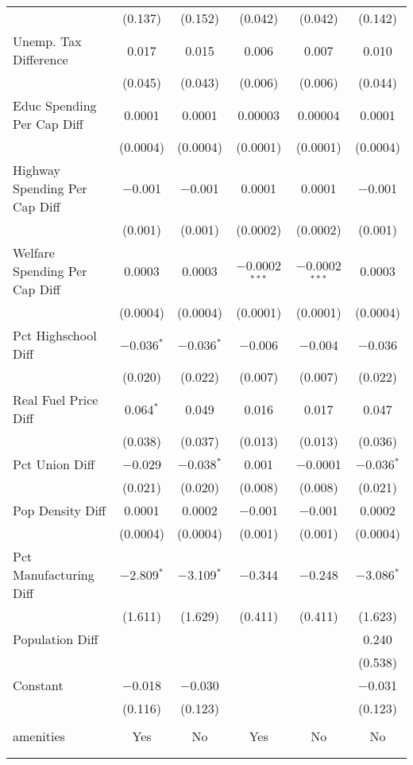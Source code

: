 \begin{table}[!htbp]
\begin{tabular}{@{\extracolsep{5pt}}lccccc}
  & (0.137) & (0.152) & (0.042) & (0.042) & (0.142) \\ 
  Unemp. Tax Difference & 0.017 & 0.015 & 0.006 & 0.007 & 0.010 \\ 
  & (0.045) & (0.043) & (0.006) & (0.006) & (0.044) \\ 
  Educ Spending Per Cap Diff & 0.0001 & 0.0001 & 0.00003 & 0.00004 & 0.0001 \\ 
  & (0.0004) & (0.0004) & (0.0001) & (0.0001) & (0.0004) \\ 
  Highway Spending Per Cap Diff & $-$0.001 & $-$0.001 & 0.0001 & 0.0001 & $-$0.001 \\ 
  & (0.001) & (0.001) & (0.0002) & (0.0002) & (0.001) \\ 
  Welfare Spending Per Cap Diff & 0.0003 & 0.0003 & $-$0.0002$^{***}$ & $-$0.0002$^{***}$ & 0.0003 \\ 
  & (0.0004) & (0.0004) & (0.0001) & (0.0001) & (0.0004) \\ 
  Pct Highschool Diff & $-$0.036$^{*}$ & $-$0.036$^{*}$ & $-$0.006 & $-$0.004 & $-$0.036 \\ 
  & (0.020) & (0.022) & (0.007) & (0.007) & (0.022) \\ 
  Real Fuel Price Diff & 0.064$^{*}$ & 0.049 & 0.016 & 0.017 & 0.047 \\ 
  & (0.038) & (0.037) & (0.013) & (0.013) & (0.036) \\ 
  Pct Union Diff & $-$0.029 & $-$0.038$^{*}$ & 0.001 & $-$0.0001 & $-$0.036$^{*}$ \\ 
  & (0.021) & (0.020) & (0.008) & (0.008) & (0.021) \\ 
  Pop Density Diff & 0.0001 & 0.0002 & $-$0.001 & $-$0.001 & 0.0002 \\ 
  & (0.0004) & (0.0004) & (0.001) & (0.001) & (0.0004) \\ 
  Pct Manufacturing Diff & $-$2.809$^{*}$ & $-$3.109$^{*}$ & $-$0.344 & $-$0.248 & $-$3.086$^{*}$ \\ 
  & (1.611) & (1.629) & (0.411) & (0.411) & (1.623) \\ 
  Population Diff &  &  &  &  & 0.240 \\ 
  &  &  &  &  & (0.538) \\ 
  Constant & $-$0.018 & $-$0.030 &  &  & $-$0.031 \\ 
  & (0.116) & (0.123) &  &  & (0.123) \\ 
 \hline \\[-1.8ex] 
amenities & Yes & No & Yes & No & No \\ 
\hline \\[-1.8ex] 
\hline 
\hline \\[-1.8ex] 
\end{tabular} 
\end{table} 
